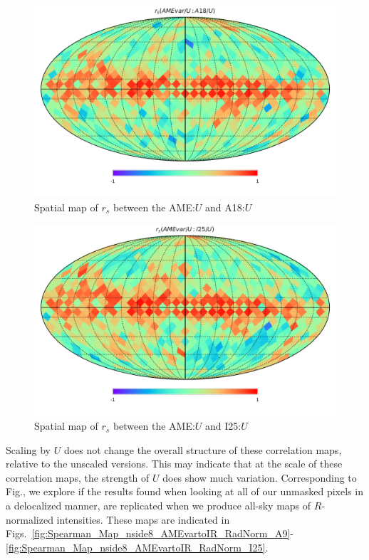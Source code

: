       \begin{figure}
        \includegraphics[width=\textwidth/2]{../Plots/Allsky_Corr/UNorm/Spearman_Map_nside8_AMEvartoA18.pdf}
        \centering
        \caption{Spatial map of $r_{s}$ between the AME:$U$ and A18:$U$}
        \label{fig:Spearman_Map_nside8_AMEvartoIR_UNorm_A18}
      \end{figure}
    \begin{figure}
         \includegraphics[width=\textwidth/2]{../Plots/Allsky_Corr/UNorm/Spearman_Map_nside8_AMEvartoI25.pdf}
         \centering
         \caption{Spatial map of $r_{s}$ between the AME:$U$ and I25:$U$}
         \label{fig:Spearman_Map_nside8_AMEvartoIR_UNorm_I25}
    \end{figure}
  Scaling by $U$ does not change the overall structure of these correlation maps, relative to the unscaled versions. This may indicate that at the scale of these correlation maps, the strength of $U$ does show much variation.
  Corresponding to Fig., we explore if the results found when looking at all of our unmasked pixels in a delocalized manner, are replicated when we produce all-sky maps of $R$-normalized intensities. These maps are indicated in Figs.~\ref{fig:Spearman_Map_nside8_AMEvartoIR_RadNorm_A9}-\ref{fig:Spearman_Map_nside8_AMEvartoIR_RadNorm_I25}.
